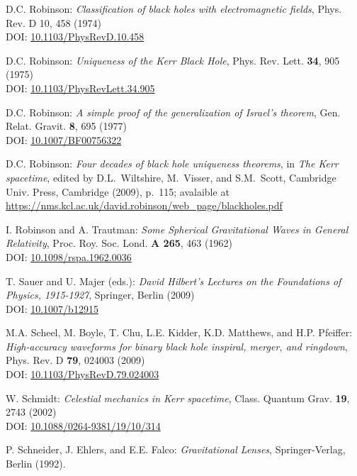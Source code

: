 \begin{thebibliography}{123}
D.C. Robinson:
{\em Classification of black holes with electromagnetic fields},
Phys. Rev. D 10, 458 (1974)\\
DOI: \href{https://doi.org/10.1103/PhysRevD.10.458}{10.1103/PhysRevD.10.458}

D.C. Robinson:
{\em Uniqueness of the Kerr Black Hole},
Phys. Rev. Lett. {\bf 34}, 905 (1975)\\
DOI: \href{https://doi.org/10.1103/PhysRevLett.34.905}{10.1103/PhysRevLett.34.905}

D.C. Robinson:
{\em A simple proof of the generalization of Israel's theorem},
Gen. Relat. Gravit. {\bf 8}, 695 (1977)\\
DOI: \href{https://doi.org/10.1007/BF00756322}{10.1007/BF00756322}

D.C. Robinson:
{\em Four decades of black hole uniqueness theorems},
in {\em The Kerr spacetime}, edited by D.L.~Wiltshire, M.~Visser, and S.M.~Scott,
Cambridge Univ. Press, Cambridge (2009), p.~115; avalaible at\\
\url{https://nms.kcl.ac.uk/david.robinson/web_page/blackholes.pdf}

I. Robinson and A. Trautman: {\em Some Spherical Gravitational Waves in General Relativity},
Proc. Roy. Soc. Lond. {\bf A 265}, 463 (1962)\\
DOI: \href{https://doi.org/10.1098/rspa.1962.0036}{10.1098/rspa.1962.0036}

T. Sauer and U. Majer (eds.):
{\em David Hilbert’s Lectures on the Foundations of Physics, 1915-1927},
Springer, Berlin (2009)\\
DOI: \href{https://doi.org/10.1007/b12915}{10.1007/b12915}

M.A. Scheel, M. Boyle, T. Chu, L.E. Kidder, K.D. Matthews, and H.P. Pfeiffer:
{\em High-accuracy waveforms for binary black hole inspiral, merger, and ringdown},
Phys. Rev. D {\bf 79}, 024003 (2009)\\
DOI: \href{https://doi.org/10.1103/PhysRevD.79.024003}{10.1103/PhysRevD.79.024003}

W. Schmidt:
{\em Celestial mechanics in Kerr spacetime},
Class. Quantum Grav. {\bf 19}, 2743 (2002)\\
DOI: \href{https://doi.org/10.1088/0264-9381/19/10/314}{10.1088/0264-9381/19/10/314}

P. Schneider, J. Ehlers, and E.E. Falco:
{\em Gravitational Lenses},
Springer-Verlag, Berlin (1992).


\end{thebibliography}
